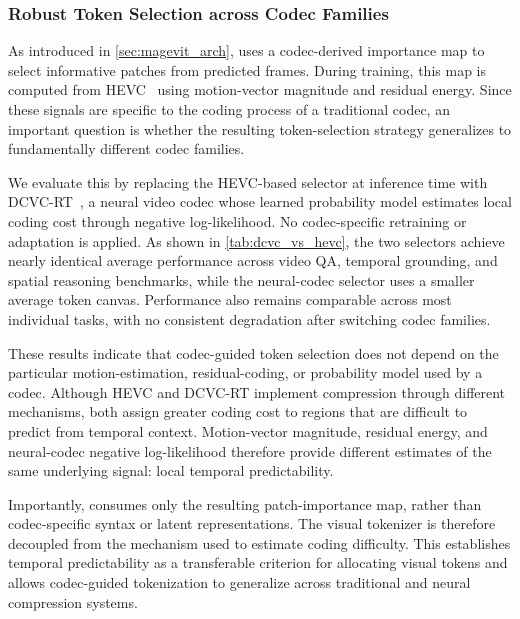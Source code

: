 

\subsubsection{Robust Token Selection across Codec Families}
\label{sec:magevit_codec_robustness}




As introduced in \cref{sec:magevit_arch}, \magevit uses a codec-derived importance map to select informative patches from predicted frames. During training, this map is computed from HEVC~\citep{sullivan2012hevc} using motion-vector magnitude and residual energy. Since these signals are specific to the coding process of a traditional codec, an important question is whether the resulting token-selection strategy generalizes to fundamentally different codec families.

We evaluate this by replacing the HEVC-based selector at inference time with DCVC-RT~\citep{jia2025towards}, a neural video codec whose learned probability model estimates local coding cost through negative log-likelihood. No codec-specific retraining or adaptation is applied. As shown in \cref{tab:dcvc_vs_hevc}, the two selectors achieve nearly identical average performance across video QA, temporal grounding, and spatial reasoning benchmarks, while the neural-codec selector uses a smaller average token canvas. Performance also remains comparable across most individual tasks, with no consistent degradation after switching codec families.

These results indicate that codec-guided token selection does not depend on the particular motion-estimation, residual-coding, or probability model used by a codec. Although HEVC and DCVC-RT implement compression through different mechanisms, both assign greater coding cost to regions that are difficult to predict from temporal context. Motion-vector magnitude, residual energy, and neural-codec negative log-likelihood therefore provide different estimates of the same underlying signal: local temporal predictability.

Importantly, \magevit consumes only the resulting patch-importance map, rather than codec-specific syntax or latent representations. The visual tokenizer is therefore decoupled from the mechanism used to estimate coding difficulty. This establishes temporal predictability as a transferable criterion for allocating visual tokens and allows codec-guided tokenization to generalize across traditional and neural compression systems.


